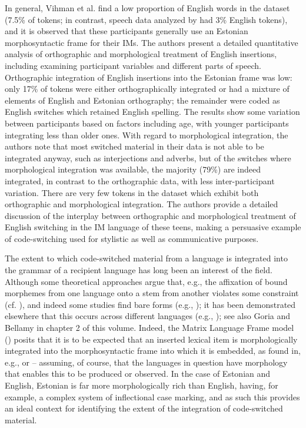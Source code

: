 \documentclass[output=paper]{langscibook}
\begin{document}
In general, Vihman et al. find a low proportion of English words in the dataset (7.5\% of tokens; in contrast, speech data analyzed by \citet{VihmanEtAl2022} had 3\% English tokens), and it is observed that these participants generally use an Estonian morphosyntactic frame for their IMs. The authors present a detailed quantitative analysis of orthographic and morphological treatment of English insertions, including examining participant variables and different parts of speech. Orthographic integration of English insertions into the Estonian frame was low: only 17\% of tokens were either orthographically integrated or had a mixture of elements of English and Estonian orthography; the remainder were coded as English switches which retained English spelling. The results show some variation between participants based on factors including age, with younger participants integrating less than older ones. With regard to morphological integration, the authors note that most switched material in their data is not able to be integrated anyway, such as interjections and adverbs, but of the switches where morphological integration was available, the majority (79\%) are indeed integrated, in contrast to the orthographic data, with less inter-participant variation. There are very few tokens in the dataset which exhibit both orthographic and morphological integration. The authors provide a detailed discussion of the interplay between orthographic and morphological treatment of English switching in the IM language of these teens, making a persuasive example of code-switching used for stylistic as well as communicative purposes.

The extent to which code-switched material from a language is integrated into the grammar of a recipient language has long been an interest of the field. Although some theoretical approaches argue that, e.g., the affixation of bound morphemes from one language onto a stem from another violates some constraint (cf. \citealt{Poplack1980}), and indeed some studies find bare forms (e.g., \citealt{Schmitt2000}); it has been demonstrated elsewhere that this occurs across different languages (e.g., \citealt{DeucharEtAl2018, Myers-Scotton2002}); see also Goria and Bellamy in chapter 2 of this volume. Indeed, the Matrix Language Frame model (\citealt{Myers-Scotton2002, Myers-ScottonJake2009}) posits that it is to be expected that an inserted lexical item is morphologically integrated into the morphosyntactic frame into which it is embedded, as found in, e.g., \citet{Deuchar2020} or \citet{DeucharEtAl2018} – assuming, of course, that the languages in question have morphology that enables this to be produced or observed. In the case of Estonian and English, Estonian is far more morphologically rich than English, having, for example, a complex system of inflectional case marking, and as such this provides an ideal context for identifying the extent of the integration of code-switched material. 
\end{document}
